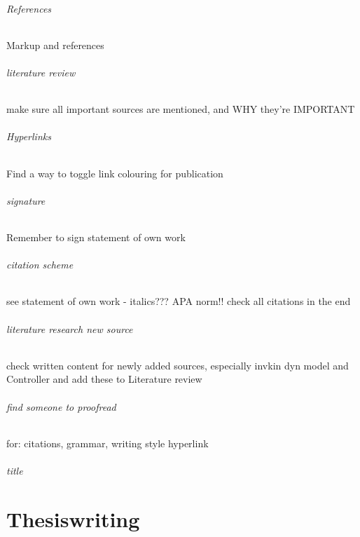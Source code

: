 \paragraph{References}
Markup and references

\paragraph{literature review}
make sure all important sources are mentioned, and WHY they're IMPORTANT

\paragraph{Hyperlinks}
Find a way to toggle link colouring for publication

\paragraph{signature}
Remember to sign statement of own work

\paragraph{citation scheme}
see statement of own work - italics???
APA norm!! check all citations in the end

\paragraph{literature research new source}
check written content for newly added sources, especially invkin dyn model and Controller and add these to Literature review

\paragraph{find someone to proofread}
for:
citations,
grammar,
writing style
hyperlink


\paragraph{title}


\cleardoublepage
\part{Thesiswriting}
\cleardoublepage